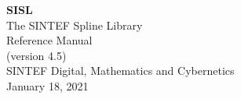 \documentclass[a4paper]{report}
\begin{document}
\begin{titlepage}
  \vspace{5 cm}
  \begin{center}
  \Huge
  \textbf{SISL} \\
  \huge
  The SINTEF Spline Library \\ 
  \LARGE
  Reference Manual \\
  (version 4.5)\\ 
  \vspace{10 mm}
  \large
  SINTEF Digital, Mathematics and Cybernetics \\
  January 18, 2021
  \end{center}

\end{titlepage}

\tableofcontents
\cleardoublepage
{}
\setcounter{page}{1}


\cleardoublepage

\cleardoublepage

\cleardoublepage

\cleardoublepage

\cleardoublepage

\cleardoublepage

\cleardoublepage

\cleardoublepage

\cleardoublepage

\cleardoublepage


\cleardoublepage

\cleardoublepage

\cleardoublepage
\printindex
\end{document}

